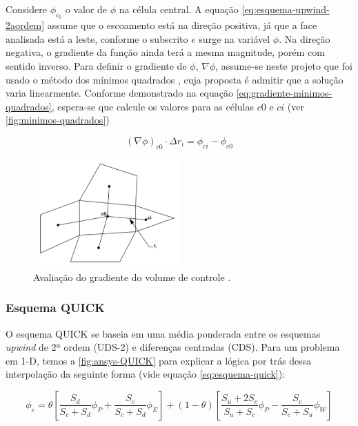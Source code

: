 Considere \(\phi_{c_0}\) o valor de \(\phi\) na célula central. A equação \ref{eq:esquema-upwind-2aordem} assume que o escoamento está na direção positiva, já que a face analisada está a leste, conforme o subscrito \(e\) surge na variável \(\phi\). Na direção negativa, o gradiente da função ainda terá a mesma magnitude, porém com sentido inverso. Para definir o gradiente de \(\phi\), \(\nabla\phi\), assume-se neste projeto que foi usado o método dos mínimos quadrados \cite{Anderson1994}, cuja proposta é admitir que a solução varia linearmente. Conforme demonstrado na equação \ref{eq:gradiente-minimos-quadrados}, espera-se que calcule os valores para as células \(c0\) e \(ci\) (ver \autoref{fig:minimos-quadrados})

\begin{equation} \label{eq:gradiente-minimos-quadrados}
    \left(\nabla\phi\right)_{c0} \cdot \Delta r_i = \phi_{ci} - \phi_{c0}
\end{equation}

\begin{figure}[!ht]
	\centering
	\includegraphics[width=0.5\textwidth]{foto02-minimos-quadrados.png}
	\caption[Avaliação do gradiente do volume de controle]{Avaliação do gradiente do volume de controle \cite{fluent2021ansys}.}
	\label{fig:minimos-quadrados}
\end{figure}
 
\subsubsection{Esquema QUICK}

O esquema QUICK \cite{Leonard1990} se baseia em uma média ponderada entre os esquemas \textit{upwind} de 2ª ordem (UDS-2) e diferenças centradas (CDS). Para um problema em 1-D, temos a \autoref{fig:ansys-QUICK} para explicar a lógica por trás dessa interpolação da seguinte forma (vide equação \ref{eq:esquema-quick}):

\begin{equation}
	\label{eq:esquema-quick}
	\phi_e = \theta\left[\frac{S_d}{S_c+S_d}\phi_P + \frac{S_c}{S_c+S_d}\phi_E \right] + (1 - \theta)\left[\frac{S_u+2S_c}{S_u+S_c}\phi_P - \frac{S_c}{S_c+S_u}\phi_W \right]
\end{equation}

